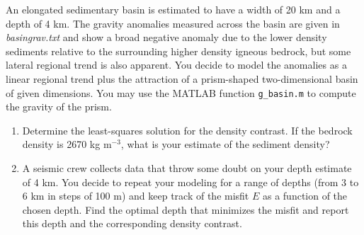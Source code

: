 \begin{problem}
An elongated sedimentary basin is estimated to have a width of 20 km and a depth of 4 km.  The gravity anomalies measured across the
basin are given in \emph{basingrav.txt} and show a broad negative anomaly due to the lower density sediments relative to
the surrounding higher density igneous bedrock, but some lateral regional trend is also apparent.  You decide to model the anomalies as
a linear regional trend plus the attraction of a
prism-shaped two-dimensional basin of given dimensions.  You may use the MATLAB function \texttt{g\_basin.m} to compute the gravity of the prism.
\begin{enumerate}[label=\alph*)]
	\item Determine the least-squares solution for the density contrast.  If the bedrock density is 2670 kg m$^{-3}$,
	what is your estimate of the sediment density?
	\item A seismic crew collects data that throw some doubt on your depth estimate of 4 km.  You decide to repeat your
	modeling for a range of depths (from 3 to 6 km in steps of 100 m) and keep track of the misfit $E$ as a function
	of the chosen depth.  Find the optimal depth that minimizes the misfit and report this depth and the corresponding density contrast.
\end{enumerate}
\end{problem}

